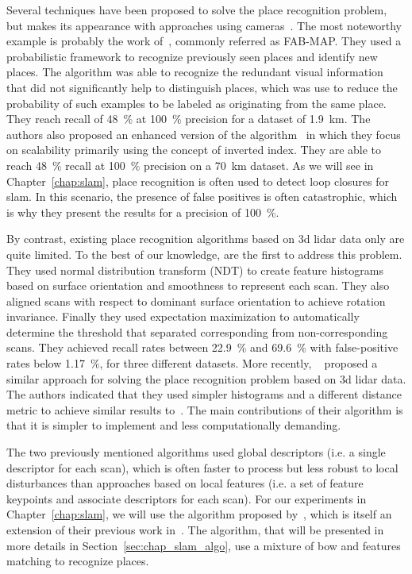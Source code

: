Several techniques have been proposed to solve the place recognition problem, but makes its appearance with approaches using cameras~\citep{Torralba2003, Ulrich2000}. The most noteworthy example is probably the work of~\citet{Cummins2008}, commonly referred as FAB-MAP. They used a probabilistic framework to recognize previously seen places and identify new places. The algorithm was able to recognize the redundant visual information that did not significantly help to distinguish places, which was use to reduce the probability of such examples to be labeled as originating from the same place. They reach recall of \SI{48}{\percent} at \SI{100}{\percent} precision for a dataset of \SI{1.9}{\kilo\meter}. The authors also proposed an enhanced version of the algorithm~\citep{Cummins2011} in which they focus on scalability primarily using the concept of inverted index. They are able to reach \SI{48}{\percent} recall at \SI{100}{\percent} precision on a \SI{70}{\kilo\meter} dataset. As we will see in Chapter~\ref{chap:slam}, place recognition is often used to detect loop closures for \gls*{slam}. In this scenario, the presence of false positives is often catastrophic, which is why they present the results for a precision of \SI{100}{\percent}.

By contrast, existing place recognition algorithms based on \gls*{3d} \gls*{lidar} data only are quite limited. To the best of our knowledge, \citet{Magnusson2009} are the first to address this problem. They used normal distribution transform (NDT) to create feature histograms based on surface orientation and smoothness to represent each scan. They also aligned scans with respect to dominant surface orientation to achieve rotation invariance. Finally they used expectation maximization to automatically determine the threshold that separated corresponding from non-corresponding scans. They achieved recall rates between \SI{22.9}{\percent} and \SI{69.6}{\percent} with false-positive rates below \SI{1.17}{\percent}, for three different datasets. More recently, ~\citet{Mack2015} proposed a similar approach for solving the place recognition problem based on \gls*{3d} lidar data. The authors indicated that they used simpler histograms and a different distance metric to achieve similar results to~\citet{Magnusson2009}. The main contributions of their algorithm is that it is simpler to implement and less computationally demanding.

The two previously mentioned algorithms used global descriptors (i.e. a single descriptor for each scan), which is often faster to process but less robust to local disturbances than approaches based on local features (i.e. a set of feature keypoints and associate descriptors for each scan). For our experiments in Chapter~\ref{chap:slam}, we will use the algorithm proposed by~\citet{Steder2011b}, which is itself an extension of their previous work in~\citep{Steder2010}. The algorithm, that will be presented in more details in Section~\ref{sec:chap_slam_algo}, use a mixture of \gls*{bow} and features matching to recognize places.

